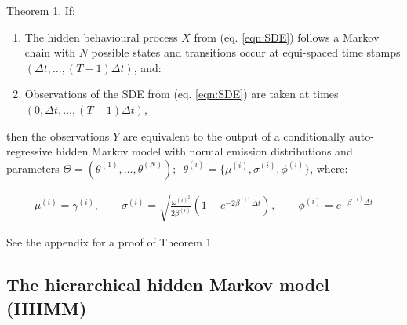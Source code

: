 \begin{theorem}{Theorem 1.}{}%
If:
\begin{enumerate}
    \item The hidden behavioural process $X$ from (eq. \ref{eqn:SDE}) follows a Markov chain with $N$ possible states and transitions occur at equi-spaced time stamps $\left(\Delta t, \ldots, (T-1)\Delta t\right)$, and:
    \item Observations of the SDE from (eq. \ref{eqn:SDE}) are taken at times $\left(0, \Delta t, \ldots, (T-1)\Delta t\right)$,
\end{enumerate}
then the observations $Y$ are equivalent to the output of a conditionally auto-regressive hidden Markov model with normal emission distributions and parameters $\Theta = (\theta^{(1)}, \ldots, \theta^{(N)}); \enspace \theta^{(i)} = \{\mu^{(i)},\sigma^{(i)},\phi^{(i)}\}$, where:

\begin{align}
\mu^{(i)} = \gamma^{(i)}, \qquad \sigma^{(i)} = \sqrt{\frac{\omega^{(i)^2}}{2\beta^{(i)}} (1-e^{-2\beta^{(i)}\Delta t})}, \qquad \phi^{(i)} = e^{-\beta^{(i)}\Delta t} \label{eqn:CarHMM_to_OU}
\end{align}

\end{theorem}

See the appendix for a proof of Theorem 1.

\subsection{The hierarchical hidden Markov model (HHMM)}

